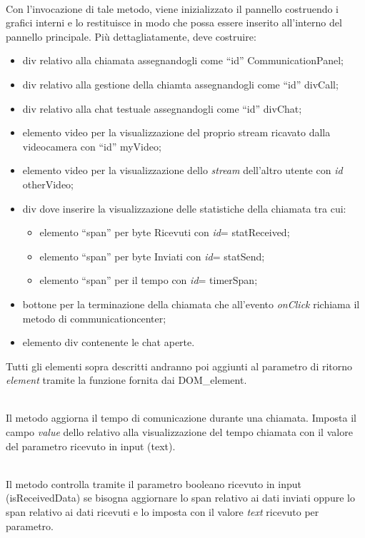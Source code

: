 \begin{description}
\item{}\\
Con l'invocazione di tale metodo, viene inizializzato il pannello costruendo i  grafici interni e lo restituisce in modo che possa essere inserito all'interno del pannello principale. Più dettagliatamente, deve costruire:
\begin{itemize}
\item div relativo alla chiamata assegnandogli come ``id'' CommunicationPanel;
\item div relativo alla gestione della chiamta assegnandogli come ``id'' divCall;
\item div relativo alla chat testuale assegnandogli come ``id'' divChat;
\item elemento video per la visualizzazione del proprio stream ricavato dalla videocamera con ``id'' myVideo;
\item elemento video per la visualizzazione dello \textit{stream} dell'altro utente con \textit{id} otherVideo;
\item div dove inserire la visualizzazione delle statistiche della chiamata tra cui:
\begin{itemize}
\item elemento ``span'' per byte Ricevuti con \textit{id}= statReceived;
\item elemento ``span'' per byte Inviati con \textit{id}= statSend;
\item elemento ``span'' per il tempo con \textit{id}= timerSpan;
\end{itemize}
\item bottone per la terminazione della chiamata che all'evento \textit{onClick} richiama il metodo  di communicationcenter;
\item elemento div contenente le chat aperte.
\end{itemize}
Tutti gli elementi sopra descritti andranno poi aggiunti al parametro di ritorno \textit{element} tramite la funzione  fornita dai DOM\_element.

\item{}\\
Il metodo aggiorna il tempo di comunicazione durante una chiamata. Imposta il campo \textit{value} dello  relativo alla visualizzazione del tempo chiamata con il valore del parametro ricevuto in input (text).

\item{}\\
Il metodo controlla tramite il parametro booleano ricevuto in input (isReceivedData) se bisogna aggiornare lo span relativo ai dati inviati oppure lo span relativo ai dati ricevuti e lo imposta con il valore \textit{text} ricevuto per parametro.


\end{description}
